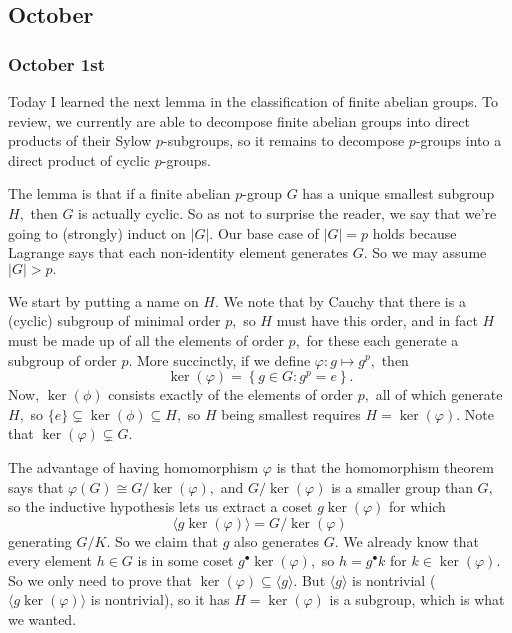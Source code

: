 \subsection{October}
\subsubsection{October 1st}
Today I learned the next lemma in the classification of finite abelian groups. To review, we currently are able to decompose finite abelian groups into direct products of their Sylow $p$-subgroups, so it remains to decompose $p$-groups into a direct product of cyclic $p$-groups.

The lemma is that if a finite abelian $p$-group $G$ has a unique smallest subgroup $H,$ then $G$ is actually cyclic. So as not to surprise the reader, we say that we're going to (strongly) induct on $|G|.$ Our base case of $|G|=p$ holds because Lagrange says that each non-identity element generates $G.$ So we may assume $|G|>p.$

We start by putting a name on $H.$ We note that by Cauchy that there is a (cyclic) subgroup of minimal order $p,$ so $H$ must have this order, and in fact $H$ must be made up of all the elements of order $p,$ for these each generate a subgroup of order $p.$ More succinctly, if we define $\varphi:g\mapsto g^p,$ then
\[\ker(\varphi)=\left\{g\in G:g^p=e\right\}.\]
Now, $\ker(\phi)$ consists exactly of the elements of order $p,$ all of which generate $H,$ so $\{e\}\subsetneq\ker(\phi)\subseteq H,$ so $H$ being smallest requires $H=\ker(\varphi).$ Note that $\ker(\varphi)\subsetneq G.$

The advantage of having homomorphism $\varphi$ is that the homomorphism theorem says that $\varphi(G)\cong G/\ker(\varphi),$ and $G/\ker(\varphi)$ is a smaller group than $G,$ so the inductive hypothesis lets us extract a coset $g\ker(\varphi)$ for which
\[\langle g\ker(\varphi)\rangle=G/\ker(\varphi)\]
generating $G/K.$ So we claim that $g$ also generates $G.$ We already know that every element $h\in G$ is in some coset $g^\bullet\ker(\varphi),$ so $h=g^\bullet k$ for $k\in\ker(\varphi).$ So we only need to prove that $\ker(\varphi)\subseteq\langle g\rangle.$ But $\langle g\rangle$ is nontrivial ($\langle g\ker(\varphi)\rangle$ is nontrivial), so it has $H=\ker(\varphi)$ is a subgroup, which is what we wanted.

